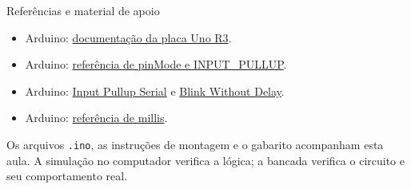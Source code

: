 \begin{frame}[t]{Referências e material de apoio}
\small
\begin{itemize}
\item Arduino: \href{https://docs.arduino.cc/hardware/uno-rev3/}{documentação da placa Uno R3}.
\item Arduino: \href{https://github.com/arduino/reference-en/blob/master/Language/Functions/Digital\%20IO/pinMode.adoc}{referência de pinMode e INPUT\_PULLUP}.
\item Arduino: \href{https://docs.arduino.cc/built-in-examples/digital/InputPullupSerial/}{Input Pullup Serial} e \href{https://docs.arduino.cc/built-in-examples/digital/BlinkWithoutDelay/}{Blink Without Delay}.
\item Arduino: \href{https://github.com/arduino/reference-en/blob/master/Language/Functions/Time/millis.adoc}{referência de millis}.
\end{itemize}
\medskip
Os arquivos \texttt{.ino}, as instruções de montagem e o gabarito acompanham esta aula. A simulação no computador verifica a lógica; a bancada verifica o circuito e seu comportamento real.
\end{frame}
